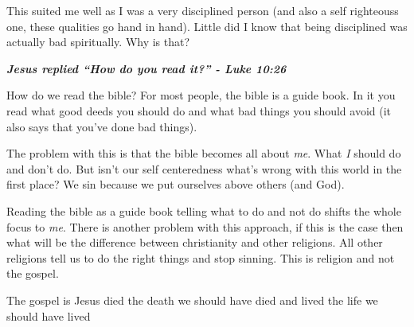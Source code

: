\documentclass[aps,preprint,preprintnumbers,nofootinbib,showpacs,prd]{revtex4-1}
\begin{document}
This suited me well as I was a very disciplined person (and also a self righteouss one, these qualities go hand in hand). Little did I know that being disciplined was actually bad spiritually. Why is that?

\bigskip
\textbf{\textit{Jesus replied ``How do you read it?'' - Luke 10:26 }}

How do we read the bible? For most people, the bible is a guide book. In it you read what good deeds you should do and what bad things you should avoid (it also says that you've done bad things).

The problem with this is that the bible becomes all about {\it me}. What {\it I} should do and don't do. But isn't our self centeredness what's wrong with this world in the first place? We sin because we put ourselves above others (and God).

Reading the bible as a guide book telling what to do and not do shifts the whole focus to {\it me}. There is another problem with this approach, if this is the case then what will be the difference between christianity and other religions. All other religions tell us to do the right things and stop sinning. This is religion and not the gospel.

The gospel is Jesus died the death we should have died and lived the life we should have lived
\end{document}
